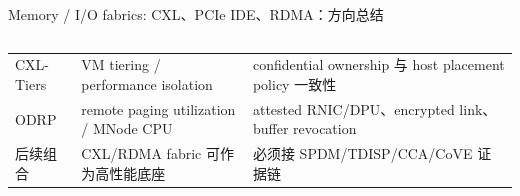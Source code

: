 \begin{frame}[t,shrink=6]{Memory / I/O fabrics: CXL、PCIe IDE、RDMA：方向总结}
\begin{columns}[T,totalwidth=\textwidth]
\begin{column}{0.49\textwidth}
{\begin{minipage}[t]{0.97\linewidth}
\begin{minipage}{0.92\linewidth}
{\begin{tabularx}{\linewidth}{@{}YYY@{}}
CXL-Tiers & VM tiering / performance isolation & confidential ownership 与 host placement policy 一致性 \\
ODRP & remote paging utilization / MNode CPU & attested RNIC/DPU、encrypted link、buffer revocation \\
后续组合 & CXL/RDMA fabric 可作为高性能底座 & 必须接 SPDM/TDISP/CCA/CoVE 证据链 \\
\bottomrule
\end{tabularx}
}
    \end{minipage}
    \vspace{1mm}
  \end{minipage}}
  \end{column}
\end{columns}
\end{frame}
